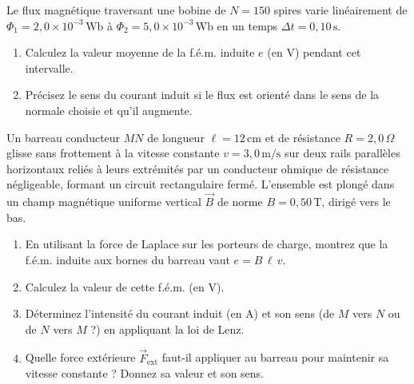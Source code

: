 \documentclass[11pt]{article}
\newcounter{popsec}
\newcounter{popsub}
\newcommand{\courssub}[1]{%
  \stepcounter{popsub}%
  \par\vspace{9pt}\noindent{\popxbold\fontsize{11.5}{13}\selectfont\color{popink}{\color{poporange}\thepopsec.\thepopsub}\hspace{6pt}#1}\par\nopagebreak\vspace{4pt}
}
\begin{document}
\begin{exercice}
Le flux magnétique traversant une bobine de $N = 150$ spires varie linéairement de $\Phi_1 = 2,0 \times 10^{-3}\,\text{Wb}$ à $\Phi_2 = 5,0 \times 10^{-3}\,\text{Wb}$ en un temps $\Delta t = 0,10\,\text{s}$.
\begin{enumerate}
    \item Calculez la valeur moyenne de la f.é.m. induite $e$ (en V) pendant cet intervalle.
    \item Précisez le sens du courant induit si le flux est orienté dans le sens de la normale choisie et qu'il augmente.
\end{enumerate}
\end{exercice}

\courssub{Je m'entraîne}

\begin{exercice}
Un barreau conducteur $MN$ de longueur $\ell = 12\,\text{cm}$ et de résistance $R = 2,0\,\Omega$ glisse sans frottement à la vitesse constante $v = 3,0\,\text{m/s}$ sur deux rails parallèles horizontaux reliés à leurs extrémités par un conducteur ohmique de résistance négligeable, formant un circuit rectangulaire fermé. L'ensemble est plongé dans un champ magnétique uniforme vertical $\vec{B}$ de norme $B = 0,50\,\text{T}$, dirigé vers le bas.
\begin{enumerate}
    \item En utilisant la force de Laplace sur les porteurs de charge, montrez que la f.é.m. induite aux bornes du barreau vaut $e = B\,\ell\,v$.
    \item Calculez la valeur de cette f.é.m. (en V).
    \item Déterminez l'intensité du courant induit (en A) et son sens (de $M$ vers $N$ ou de $N$ vers $M$ ?) en appliquant la loi de Lenz.
    \item Quelle force extérieure $\vec{F}_{\text{ext}}$ faut-il appliquer au barreau pour maintenir sa vitesse constante ? Donnez sa valeur et son sens.
\end{enumerate}
\end{exercice}
\end{document}
